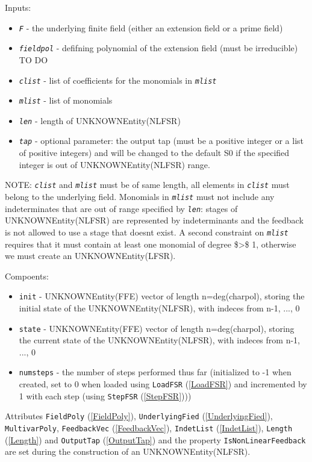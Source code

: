 \documentclass[a4paper,11pt]{report}
\begin{document}
{{{ Inputs: 
\begin{itemize}
\item  \mbox{\texttt{\mdseries\slshape F}} - the underlying finite field (either an extension field or a prime field)
\item  \mbox{\texttt{\mdseries\slshape fieldpol}} - defifning polynomial of the extension field (must be irreducible) TO DO 
\item  \mbox{\texttt{\mdseries\slshape clist}} - list of coefficients for the monomials in \mbox{\texttt{\mdseries\slshape mlist}} 
\item  \mbox{\texttt{\mdseries\slshape mlist}} - list of monomials 
\item  \mbox{\texttt{\mdseries\slshape len}} - length of UNKNOWNEntity(NLFSR) 
\item  \mbox{\texttt{\mdseries\slshape tap}} - optional parameter: the output tap (must be a positive integer or a list of
positive integers) and will be changed to the default S{\textunderscore}0 if
the specified integer is out of UNKNOWNEntity(NLFSR) range.
\end{itemize}
 NOTE: \mbox{\texttt{\mdseries\slshape clist}} and \mbox{\texttt{\mdseries\slshape mlist}} must be of same length, all elements in \mbox{\texttt{\mdseries\slshape clist}} must belong to the underlying field. Monomials in \mbox{\texttt{\mdseries\slshape mlist}} must not include any indeterminates that are out of range specified by \mbox{\texttt{\mdseries\slshape len}}: stages of UNKNOWNEntity(NLFSR) are represented by indeterminants and the
feedback is not allowed to use a stage that doesnt exist. A second constraint
on \mbox{\texttt{\mdseries\slshape mlist}} requires that it must contain at least one monomial of degree
\${\textgreater}\$ 1, otherwise we must create an UNKNOWNEntity(LFSR). 

 Compoents: 
\begin{itemize}
\item  \texttt{init} - UNKNOWNEntity(FFE) vector of length n=deg(charpol), storing the initial
state of the UNKNOWNEntity(NLFSR), with indeces from n-1, ..., 0
\item  \texttt{state} - UNKNOWNEntity(FFE) vector of length n=deg(charpol), storing the current
state of the UNKNOWNEntity(NLFSR), with indeces from n-1, ..., 0
\item  \texttt{numsteps} - the number of steps performed thus far (initialized to -1 when created, set
to 0 when loaded using \texttt{LoadFSR} (\ref{LoadFSR}) and incremented by 1 with each step (using \texttt{StepFSR} (\ref{StepFSR}))) 
\end{itemize}
 Attributes \texttt{FieldPoly} (\ref{FieldPoly}), \texttt{UnderlyingFied} (\ref{UnderlyingFied}), \texttt{MultivarPoly}, \texttt{FeedbackVec} (\ref{FeedbackVec}), \texttt{IndetList} (\ref{IndetList}), \texttt{Length} (\ref{Length}) and \texttt{OutputTap} (\ref{OutputTap}) and the property \texttt{IsNonLinearFeedback} are set during the construction of an UNKNOWNEntity(NLFSR). 

}}}
\end{document}
